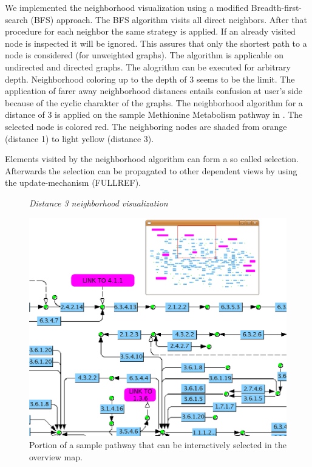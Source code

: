 We implemented the neighborhood visualization using a modified Breadth-first-search (BFS) approach\cite{Cormen2001}. The BFS algorithm visits all direct neighbors. After that procedure for each neighbor the same strategy is applied. If an already visited node is inspected it will be ignored. This assures that only the shortest path to a node is considered (for unweighted graphs). The algorithm is applicable on undirected and directed graphs.
The alogrithm can be executed for arbitrary depth. Neighborhood coloring up to the depth of 3 seems to be the limit. The application of farer away neighborhood distances entails confusion at user's side because of the cyclic charakter of the graphs. 
The neighborhood algorithm for a distance of 3 is applied on the sample Methionine Metabolism pathway in . The selected node is colored red. The neighboring nodes are shaded from orange (distance 1) to light yellow (distance 3).

Elements visited by the neighborhood algorithm can form a so called selection. Afterwards the selection can be propagated to other dependent views by using the update-mechanism (FULLREF).

\begin{figure}[ht]
\centering
{} 
\caption[Distance 3 neighborhood visualization]{\textit{Distance 3 neighborhood visualization}} 
\label{gfx:neighborhood_visualization_distance_3}
\end{figure}

\begin{figure}[ht]
  \centering
    \includegraphics[width=0.5\linewidth]{gfx/overview_method}
  \caption{Portion of a sample pathway that can be interactively selected in the overview map.}
  \label{fig:overview_method}
\end{figure}

